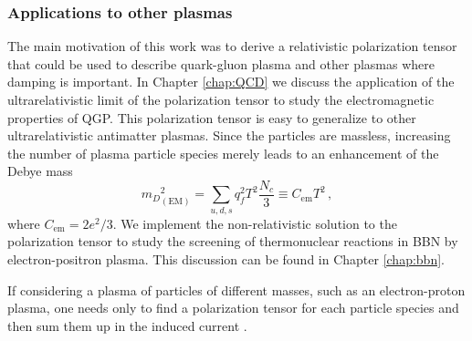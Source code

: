 \subsubsection{Applications to other plasmas}
The main motivation of this work was to derive a relativistic polarization tensor that could be used to describe quark-gluon plasma and other plasmas where damping is important. In Chapter \ref{chap:QCD} we discuss the application of the ultrarelativistic limit of the polarization tensor to study the electromagnetic properties of QGP. This polarization tensor is easy to generalize to other ultrarelativistic antimatter plasmas. Since the particles are massless, increasing the number of plasma particle species merely leads to an enhancement of the Debye mass \cite{Grayson:2022asf,Kapusta:1992fm}
\begin{equation}\label{eq:Debyem}
    {m_D}^2_{(\text{EM})} = \sum_{u,d,s} q^2_f T^2 \frac{N_c}{3} \equiv C_{\text{em}}T^2\,,
\end{equation}
where $C_{\text{em}} =  2e^2/3$. We implement the non-relativistic solution to the polarization tensor to study the screening of thermonuclear reactions in BBN by electron-positron plasma. This discussion can be found in Chapter \ref{chap:bbn}.

If considering a plasma of particles of different masses, such as an electron-proton plasma, one needs only to find a polarization tensor for each particle species and then sum them up in the induced current .

